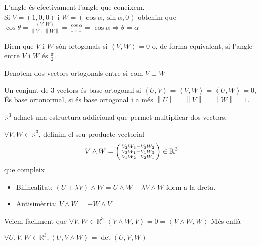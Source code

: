 \documentclass[a4paper,12pt]{article}
\begin{document}
	L'angle és efectivament l'angle que coneixem.\\
	Si $V = (1,0,0)\text{ i }W = (\cos{\alpha}, \sin{\alpha}, 0)$ obtenim que $\cos{\theta} = \frac{\left\langle V, W\right\rangle}{\left\lVert V\right\rVert\left\lVert W\right\rVert } = \frac{\cos{\alpha}}{1\times1} = \cos{\alpha} \Rightarrow \theta = \alpha$
	\begin{definicio}
	    Diem que $V\text{ i }W$ són ortogonals si $\left\langle V, W\right\rangle = 0$ o, de forma
	    equivalent, si l'angle entre $V\text{ i }W$ és $\frac{\pi}{2}$.\\
	    \begin{notacio}
	        Denotem dos vectors ortogonals entre si com $V\perp W$
	    \end{notacio}
	    Un conjunt de 3 vectors és base ortogonal si $\left\langle U, V\right\rangle = \left\langle V, W\right\rangle = \left\langle U, W\right\rangle = 0$,
	    És base ortonormal, si és base ortogonal i a més $\left\lVert U\right\rVert = \left\lVert V\right\rVert = \left\lVert W\right\rVert = 1$.
	\end{definicio}
	$\mathbb{R}^3$ admet una estructura addicional que permet multiplicar dos vectors:
	\begin{definicio}
	    $\forall V, W \in \mathbb{R}^3$, definim el seu producte vectorial
	    \begin{displaymath}
	        V\wedge W = \begin{psmallmatrix}
	        V_2W_3-V_3W_2\\
	        V_3W_1-V_1W_3\\
	        V_1W_2-V_2W_1
	        \end{psmallmatrix} \in \mathbb{R}^3
	    \end{displaymath}
	    que compleix
	    \begin{itemize}
	        \item Bilinealitat: $(U + \lambda V) \wedge W = U\wedge W + \lambda V\wedge W$ ídem a la
	        dreta.
	        \item Antisimètria: $V\wedge W = -W \wedge V$
	    \end{itemize}
	\end{definicio}
	Veiem fàcilment que $\forall V, W \in \mathbb{R}^3$ $\left\langle V\wedge W, V\right\rangle = 0 = \left\langle V\wedge W, W\right\rangle$
	Més enllà
	\begin{proposition}
	    $\forall U, V, W \in \mathbb{R}^3, \left\langle U, V\wedge W\right\rangle = \det{\left(U, V, W\right)}$
	\end{proposition}
\end{document}
